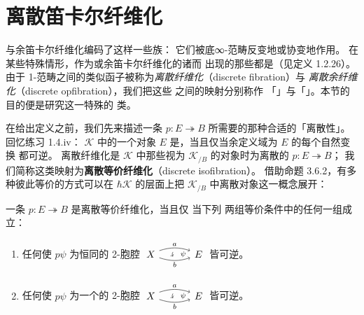 \providecommand{\qcor}[1]{\ulcorner#1\urcorner}   %
\providecommand{\cellpair}[5]{$\vcenter{\hbox{\begin{tikzpicture}[x=1.15em,y=1.15em]%
\node (s) at (0,0) {$#1$};%
\node (t) at (4.2,0) {$#2$};%
\draw[->] (0.75,0.32) to[bend left=18] (3.45,0.32);%
\node at (2.1,0.88) {$\scriptstyle#3$};%
\draw[->] (0.75,-0.32) to[bend right=18] (3.45,-0.32);%
\node at (2.1,-0.93) {$\scriptstyle#4$};%
\draw[->] (1.95,0.2) to[bend right=32] (1.95,-0.2);%
\node at (2.85,0) {$\scriptstyle#5$};%
\end{tikzpicture}}}$\ignorespaces}

\section{离散笛卡尔纤维化}\label{sec:discrete-cartesian-fibrations}

\trCartesianFibration{}与余笛卡尔纤维化编码了这样一些\trInfinityCategory{}族：%
它们被底∞-范畴反变地或协变地作用。
在某些特殊情形，作为\trCartesianFibration{}或余笛卡尔纤维化的诸\trFiber{}而%
出现的那些\trInfinityCategory{}都是\emph{\trDiscrete}（见定义 1.2.26）。
由于 1-范畴之间的类似函子被称为\emph{离散纤维化}（discrete fibration）与%
\emph{离散余纤维化}（discrete opfibration），我们把这些\trInfinityCategory{}%
之间的映射分别称作
「\trDiscreteCartesianFibration」与「\trDiscreteCocartesianFibration」。本节的目的便是研究这一特殊的%
\trFibration{}类。

在给出定义之前，我们先来描述一条\trIsofibration{} $p\colon E\twoheadrightarrow B$
所需要的那种合适的「离散性」。回忆练习 1.4.iv：\trInfinityCosmos{} $\mathcal{K}$
中的一个对象 $E$ 是\textbf{\trDiscrete}，当且仅当余定义域为 $E$ 的每个自然变换%
都可逆。
离散纤维化是\trInfinityCosmos{} $\mathcal{K}$ 中那些视为\trSliceInfinityCosmos{}
$\mathcal{K}_{/B}$ 的对象时为离散的\trIsofibration{} $p\colon E\twoheadrightarrow B$；
我们简称这类映射为\textbf{离散等价纤维化}（discrete isofibration）。
借助命题 3.6.2，有多种彼此等价的方式可以在\trHomotopyTwoCategory{}
$\hbar\mathcal{K}$ 的层面上把 $\mathcal{K}_{/B}$ 中离散对象这一概念展开：

\begin{lemma}\label{lem:discrete-isofibration-characterizations}
一条\trIsofibration{} $p\colon E\twoheadrightarrow B$ 是离散等价纤维化，当且仅%
当下列%
两组等价条件中的任何一组成立：
\begin{enumerate}[label=(\roman*)]
\item 任何使 $p\psi$ 为恒同的 2-胞腔
\cellpair{X}{E}{a}{b}{\psi}
皆可逆。
\item 任何使 $p\psi$ 为一个\trIsomorphism{}的 2-胞腔
\cellpair{X}{E}{a}{b}{\psi}
皆可逆。
\end{enumerate}
\end{lemma}

